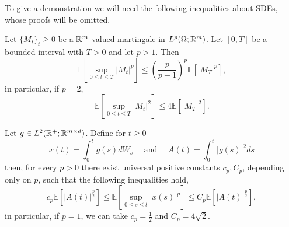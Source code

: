 To give a demonstration we will need the following inequalities about SDEs, whose proofs will be omitted.
\begin{theorem}
	\label{thm:Doobs}
	Let $\{M_t\}_t\geq 0$ be a $\mathbb{R}^m$-valued martingale in $L^{p}(\Omega;\mathbb{R}^m)$. Let $[0,T]$ be a bounded interval with $T>0$ and let $p>1$. Then
	\begin{equation}
		\mathbb{E}\left[ \sup_{0\leq t\leq T}|M_t|^p\right]\leq \left(\frac{p}{p-1}\right)^p \mathbb{E}[|M_T|^p],
	\end{equation}
	in particular, if $p=2$,
	\begin{equation}
		\mathbb{E}\left[ \sup_{0\leq t\leq T}|M_t|^2\right]\leq4 \mathbb{E}[|M_T|^2].
	\end{equation}
\end{theorem}
\begin{theorem}
 \label{thm:BDGineq}
	Let $g\in L^2(\mathbb{R}^+;\mathbb{R}^{m\times d})$. Define for $t\geq 0$
	\begin{equation*}
		x(t)=\int_{0}^{t}g(s)dW_s\quad \text{ and }\quad  A(t)=\int_{0}^{t}|g(s)|^2 ds
	\end{equation*}
	then, for every $p>0$ there exist universal positive constants $c_p,C_p$, depending only on $p$, such that the following inequalities hold,
	\begin{equation}
		c_p\mathbb{E}[|A(t)|^{\frac{p}{2}}]\leq \mathbb{E}\left[\sup_{0\leq s\leq t}|x(s)|^p\right]\leq C_p\mathbb{E}[|A(t)|^{\frac{p}{2}}],
	\end{equation}
in particular, if $p=1$, we can take $c_p=\frac{1}{2}$ and $C_p=4\sqrt{2}$.
\end{theorem}
